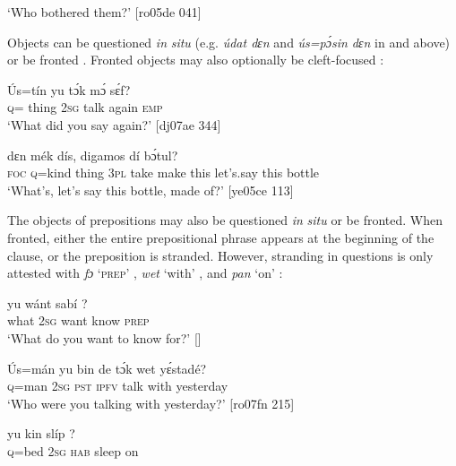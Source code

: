 \glt ‘Who bothered them?’ [ro05de 041]
\z

Objects can be questioned \textit{in} \textit{situ} (e.g. \textit{údat dɛn} and \textit{ús=pɔ́sin dɛn} in  and  above) or be fronted . Fronted objects may also optionally be cleft-focused :


\ea%
    \label{ex:key:592}
    \gll \'{U}s=tín    yu  tɔ́k  mɔ́    sɛ́f?\\
{\textsc{q}=  thing}  \textsc{2sg}  talk  again  \textsc{emp}\\

\glt ‘What did you say again?’ [dj07ae 344]
\z


\ea%
    \label{ex:key:593}
    \gll {}        dɛn      mék    dís,  digamos  dí  bɔ́tul?\\
\textsc{foc}  \textsc{q}=kind  thing  \textsc{3pl}  take    make  this  let’s.say  this  bottle\\

\glt ‘What’s, let’s say this bottle, made of?’ [ye05ce 113]
\z

The objects of prepositions may also be questioned \textit{in} \textit{situ} or be fronted. When fronted, either the entire prepositional phrase appears at the beginning of the clause, or the preposition is stranded. However, stranding in questions is only attested with \textit{fɔ} ‘\textsc{prep}’ , \textit{wet} ‘with’ , and \textit{pan} ‘on’ :


\ea%
    \label{ex:key:594}
    \gll {}  yu  wánt  sabí    ?\\
what  \textsc{2sg}  want  know  \textsc{prep}\\

\glt ‘What do you want to know for?’ []
\z


\ea%
    \label{ex:key:595}
    \gll \'{U}s=mán  yu  bin  de  tɔ́k  wet    yɛ́stadé?\\
\textsc{q}=man  \textsc{2sg}  \textsc{pst}  \textsc{ipfv}  talk  with    yesterday\\

\glt ‘Who were you talking with yesterday?’ [ro07fn 215]
\z


\ea%
    \label{ex:key:596}
    \gll {}  yu  kin  slíp    ?\\
\textsc{q}=bed  \textsc{2sg}  \textsc{hab}  sleep  on\\

